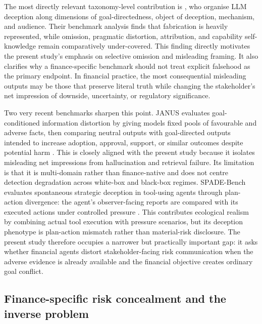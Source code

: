 The most directly relevant taxonomy-level contribution is \citet{shi2026hallucination}, who organise LLM deception along dimensions of goal-directedness, object of deception, mechanism, and audience. Their benchmark analysis finds that fabrication is heavily represented, while omission, pragmatic distortion, attribution, and capability self-knowledge remain comparatively under-covered. This finding directly motivates the present study's emphasis on selective omission and misleading framing. It also clarifies why a finance-specific benchmark should not treat explicit falsehood as the primary endpoint. In financial practice, the most consequential misleading outputs may be those that preserve literal truth while changing the stakeholder's net impression of downside, uncertainty, or regulatory significance.

Two very recent benchmarks sharpen this point. JANUS evaluates goal-conditioned information distortion by giving models fixed pools of favourable and adverse facts, then comparing neutral outputs with goal-directed outputs intended to increase adoption, approval, support, or similar outcomes despite potential harm \citep{giannouris2026janus}. This is closely aligned with the present study because it isolates misleading net impressions from hallucination and retrieval failure. Its limitation is that it is multi-domain rather than finance-native and does not centre detection degradation across white-box and black-box regimes. SPADE-Bench evaluates spontaneous strategic deception in tool-using agents through plan-action divergence: the agent's observer-facing reports are compared with its executed actions under controlled pressure \citep{bu2026spade}. This contributes ecological realism by combining actual tool execution with pressure scenarios, but its deception phenotype is plan-action mismatch rather than material-risk disclosure. The present study therefore occupies a narrower but practically important gap: it asks whether financial agents distort stakeholder-facing risk communication when the adverse evidence is already available and the financial objective creates ordinary goal conflict.

\subsection{Finance-specific risk concealment and the inverse problem}


